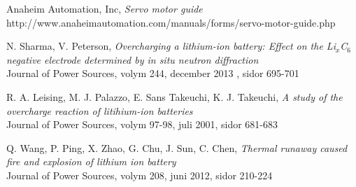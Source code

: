 \documentclass[a4paper,12pt]{article}
\begin{document}
\begin{thebibliography}{9}
 Anaheim Automation, Inc, \emph{Servo motor guide}\\
 http://www.anaheimautomation.com/manuals/forms/servo-motor-guide.php

 N. Sharma, V. Peterson, \emph{Overcharging a lithium-ion battery: Effect on the Li$_{x}$C$_{6}$ negative electrode determined by in situ neutron diffraction}
\\ Journal of Power Sources, volym 244, december 2013 , sidor 695-701

 R. A. Leising, M. J. Palazzo, E. Sans Takeuchi, K. J. Takeuchi, \emph{A study of the overcharge reaction of litihium-ion batteries}
\\ Journal of Power Sources, volym 97-98, juli 2001, sidor 681-683

 Q. Wang, P. Ping, X. Zhao, G. Chu, J. Sun, C. Chen, \emph{Thermal runaway caused fire and explosion of lithium ion battery}
\\ Journal of Power Sources, volym 208, juni 2012, sidor 210-224

\end{thebibliography}
\end{document}
